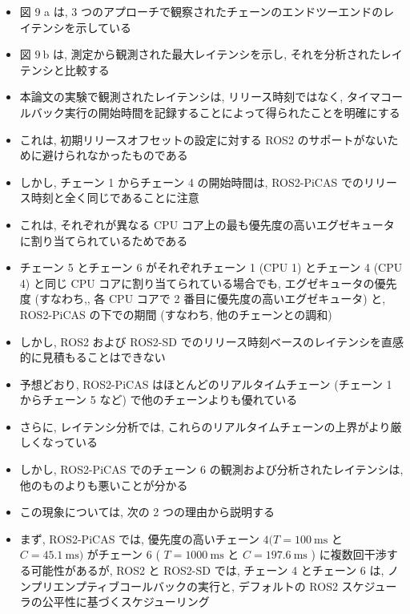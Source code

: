 \begin{frame}{}
    \begin{itemize}
        \item 図 9 a は, 3 つのアプローチで観察されたチェーンのエンドツーエンドのレイテンシを示している
\item 図 $9 \mathrm{~b}$ は, 測定から観測された最大レイテンシを示し, それを分析されたレイテンシと比較する
\item 本論文の実験で観測されたレイテンシは, リリース時刻ではなく, タイマコールバック実行の開始時間を記録することによって得られたことを明確にする
\item これは, 初期リリースオフセットの設定に対する ROS2 のサポートがないために避けられなかったものである
\item しかし, チェーン 1 からチェーン 4 の開始時間は, ROS2-PiCAS でのリリース時刻と全く同じであることに注意
\item これは, それぞれが異なる CPU コア上の最も優先度の高いエグゼキュータに割り当てられているためである
\item チェーン 5 とチェーン 6 がそれぞれチェーン 1 (CPU 1) とチェーン 4 (CPU 4) と同じ CPU コアに割り当てられている場合でも, エグゼキュータの優先度 (すなわち,, 各 CPU コアで 2 番目に優先度の高いエグゼキュータ) と, ROS2-PiCAS の下での期間 (すなわち, 他のチェーンとの調和)
\item しかし, ROS2 および ROS2-SD でのリリース時刻ベースのレイテンシを直感的に見積もることはできない
    \end{itemize}
\end{frame}

\begin{frame}{}
    \begin{itemize}
        \item 予想どおり, ROS2-PiCAS はほとんどのリアルタイムチェーン (チェーン 1 からチェーン 5 など) で他のチェーンよりも優れている
\item さらに, レイテンシ分析では, これらのリアルタイムチェーンの上界がより厳しくなっている
\item しかし, ROS2-PiCAS でのチェーン 6 の観測および分析されたレイテンシは, 他のものよりも悪いことが分かる
\item この現象については, 次の 2 つの理由から説明する
    \end{itemize}
\end{frame}

\begin{frame}{}
    \begin{itemize}
        \item まず, ROS2-PiCAS では, 優先度の高いチェーン $4(T=100 \mathrm{~ms}$ と $C=45.1 \mathrm{~ms})$ がチェーン 6 ( $T=1000 \mathrm{~ms}$ と $C=197.6 \mathrm{~ms}$ ) に複数回干渉する可能性があるが, ROS2 と ROS2-SD では, チェーン 4 とチェーン 6 は, ノンプリエンプティブコールバックの実行と, デフォルトの ROS2 スケジューラの公平性に基づくスケジューリング
    \end{itemize}
\end{frame}

